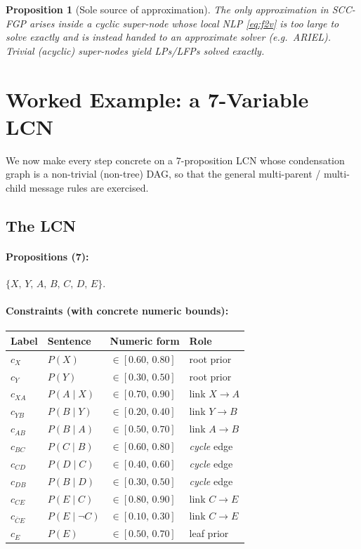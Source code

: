 \documentclass[11pt]{article}
\newtheorem{proposition}{Proposition}
\begin{document}
\begin{proposition}[Sole source of approximation]
The only approximation in SCC-FGP arises \emph{inside} a cyclic super-node
whose local NLP \eqref{eq:f2v} is too large to solve exactly and is instead
handed to an approximate solver (e.g.\ ARIEL). Trivial (acyclic) super-nodes
yield LPs/LFPs solved exactly.
\end{proposition}

\section{Worked Example: a 7-Variable LCN}\label{sec:example}

We now make every step concrete on a $7$-proposition LCN whose condensation
graph is a non-trivial (non-tree) DAG, so that the general multi-parent /
multi-child message rules are exercised.

\subsection{The LCN}

\paragraph{Propositions (7):} $\{X,\,Y,\,A,\,B,\,C,\,D,\,E\}$.

\paragraph{Constraints (with concrete numeric bounds):}
\begin{center}
\begin{tabular}{llll}
\toprule
Label & Sentence & Numeric form & Role \\
\midrule
$c_X$    & $P(X)$        & $\in[0.60,\,0.80]$ & root prior \\
$c_Y$    & $P(Y)$        & $\in[0.30,\,0.50]$ & root prior \\
$c_{XA}$ & $P(A\mid X)$  & $\in[0.70,\,0.90]$ & link $X\!\to\!A$ \\
$c_{YB}$ & $P(B\mid Y)$  & $\in[0.20,\,0.40]$ & link $Y\!\to\!B$ \\
$c_{AB}$ & $P(B\mid A)$  & $\in[0.50,\,0.70]$ & link $A\!\to\!B$ \\
$c_{BC}$ & $P(C\mid B)$  & $\in[0.60,\,0.80]$ & \emph{cycle} edge \\
$c_{CD}$ & $P(D\mid C)$  & $\in[0.40,\,0.60]$ & \emph{cycle} edge \\
$c_{DB}$ & $P(B\mid D)$  & $\in[0.30,\,0.50]$ & \emph{cycle} edge \\
$c_{CE}$ & $P(E\mid C)$  & $\in[0.80,\,0.90]$ & link $C\!\to\!E$ \\
$c_{\bar C E}$ & $P(E\mid \neg C)$ & $\in[0.10,\,0.30]$ & link $C\!\to\!E$ \\
$c_E$    & $P(E)$        & $\in[0.50,\,0.70]$ & leaf prior \\
\bottomrule
\end{tabular}
\end{center}
\end{document}
